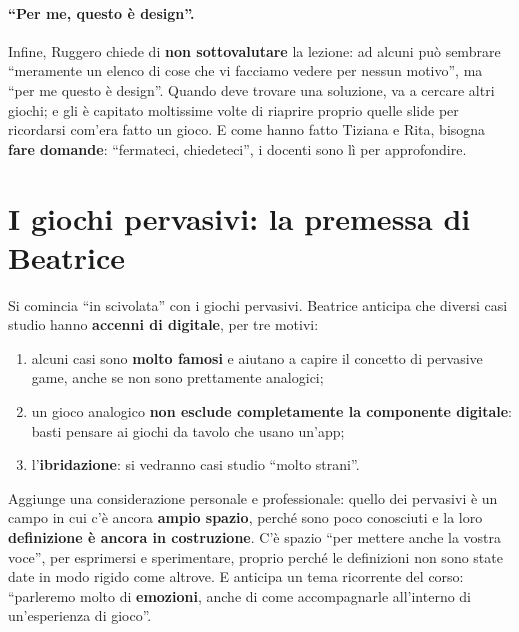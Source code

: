 \paragraph{``Per me, questo è design''.} Infine, Ruggero chiede di \textbf{non
sottovalutare} la lezione: ad alcuni può sembrare ``meramente un elenco di cose
che vi facciamo vedere per nessun motivo'', ma ``per me questo è design''.
Quando deve trovare una soluzione, va a cercare altri giochi; e gli è capitato
moltissime volte di riaprire proprio quelle slide per ricordarsi com'era fatto un
gioco. E come hanno fatto Tiziana e Rita, bisogna \textbf{fare domande}:
``fermateci, chiedeteci'', i docenti sono lì per approfondire.

\section{I giochi pervasivi: la premessa di Beatrice}
\label{a2:sec:pervasivi}

Si comincia ``in scivolata'' con i giochi pervasivi. Beatrice anticipa che
diversi casi studio hanno \textbf{accenni di digitale}, per tre motivi:
\begin{enumerate}
  \item alcuni casi sono \textbf{molto famosi} e aiutano a capire il concetto di
        pervasive game, anche se non sono prettamente analogici;
  \item un gioco analogico \textbf{non esclude completamente la componente
        digitale}: basti pensare ai giochi da tavolo che usano un'app;
  \item l'\textbf{ibridazione}: si vedranno casi studio ``molto strani''.
\end{enumerate}
Aggiunge una considerazione personale e professionale: quello dei pervasivi è
un campo in cui c'è ancora \textbf{ampio spazio}, perché sono poco conosciuti e
la loro \textbf{definizione è ancora in costruzione}. C'è spazio ``per mettere
anche la vostra voce'', per esprimersi e sperimentare, proprio perché le
definizioni non sono state date in modo rigido come altrove. E anticipa un tema
ricorrente del corso: ``parleremo molto di \textbf{emozioni}, anche di come
accompagnarle all'interno di un'esperienza di gioco''.

